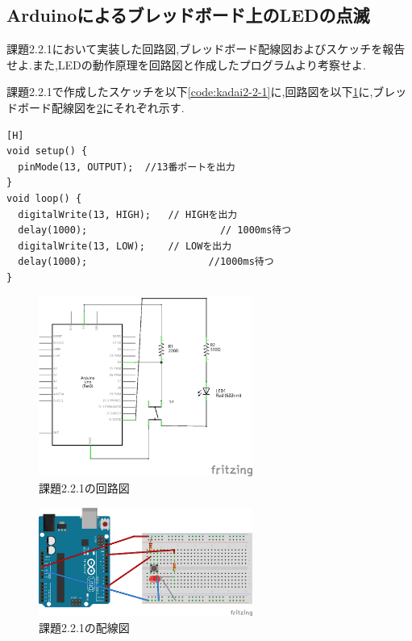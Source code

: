 \documentclass{jarticle}
\begin{document}
\subsection{Arduinoによるブレッドボード上のLEDの点滅}
課題2.2.1において実装した回路図,ブレッドボード配線図およびスケッチを報告せよ.また,LEDの動作原理を回路図と作成したプログラムより考察せよ.

課題2.2.1で作成したスケッチを以下\ref{code:kadai2-2-1}に,回路図を以下\ref{fig:2-2-1kairo}に,ブレッドボード配線図を\ref{fig:2-2-1bread}にそれぞれ示す.

\begin{lstlisting}[caption = 課題2.2.1,label=code:kadai2-2-1][H]
void setup() {
  pinMode(13, OUTPUT);  //13番ポートを出力
}
void loop() {
  digitalWrite(13, HIGH);   // HIGHを出力
  delay(1000);                       // 1000ms待つ
  digitalWrite(13, LOW);    // LOWを出力
  delay(1000);                     //1000ms待つ
}
\end{lstlisting}

\begin{figure}[H]
\begin{center}
\includegraphics[width=7.0cm]{images/kadai2-2-1_kairo.png}
\caption{課題2.2.1の回路図}
\label{fig:2-2-1kairo}
\end{center}
\end{figure}


\begin{figure}[H]
\begin{center}
\includegraphics[width=7.0cm]{images/kadai2-2-1_bread.png}
\caption{課題2.2.1の配線図}
\label{fig:2-2-1bread}
\end{center}
\end{figure}
\end{document}
